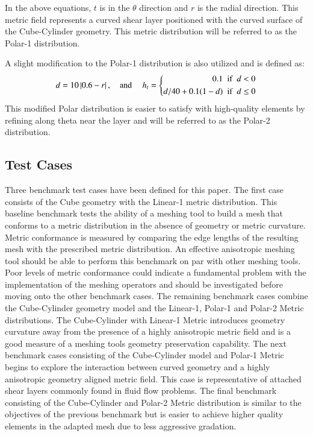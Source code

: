 \documentclass[3p,times,procedia,number]{elsarticle}
\begin{document}
In the above equations, $t$ is in the $\theta$ direction and $r$ is the radial direction.
This metric field represents a curved shear layer positioned with the curved surface of the Cube-Cylinder geometry.
This metric distribution will be referred to as the Polar-1 distribution.

A slight modification to the Polar-1 distribution is also utilized and is defined as:
\begin{equation}
  d = 10 \left|0.6 - r\right|, \textrm{\quad and \quad} h_t =  
  \left\{ 
  \begin{aligned}
  0.1  \textrm{\; if \;} &d < 0 \\
  d / 40 + 0.1 (1 - d)   \textrm{\; if \;}& d \leq 0
  \end{aligned}
  \right.
\end{equation}
This modified Polar distribution is easier to satisfy with high-quality elements by refining along theta near the layer and will be referred to as the Polar-2 distribution.

\subsection{Test Cases}

Three benchmark test cases have been defined for this paper.
The first case consists of the Cube geometry with the Linear-1 metric distribution.
This baseline benchmark tests the ability of a meshing tool to build a mesh that conforms to a metric distribution in the absence of geometry or metric curvature.
Metric conformance is measured by comparing the edge lengths of the resulting mesh with the prescribed metric distribution.
An effective anisotropic meshing tool should be able to perform this benchmark on par with other meshing tools.
Poor levels of metric conformance could indicate a fundamental problem with the implementation of the meshing operators and should be investigated before moving onto the other benchmark cases.
The remaining benchmark cases combine the Cube-Cylinder geometry model and the Linear-1, Polar-1 and Polar-2 Metric distributions.
The Cube-Cylinder with Linear-1 Metric introduces geometry curvature away from the presence of a highly anisotropic metric field and is a good measure of a meshing tools geometry preservation capability.
The next benchmark cases consisting of the Cube-Cylinder model and Polar-1 Metric begins to explore the interaction between curved geometry and a highly anisotropic geometry aligned metric field.
This case is representative of attached shear layers commonly found in fluid flow problems.
The final benchmark consisting of the Cube-Cylinder and Polar-2 Metric distribution is similar to the objectives of the previous benchmark but is easier to achieve higher quality elements in the adapted mesh due to less aggressive gradation.  
\end{document}
